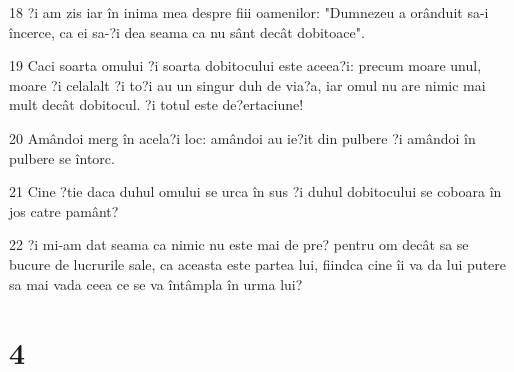 \par 18 ?i am zis iar în inima mea despre fiii oamenilor: "Dumnezeu a orânduit sa-i încerce, ca ei sa-?i dea seama ca nu sânt decât dobitoace".
\par 19 Caci soarta omului ?i soarta dobitocului este aceea?i: precum moare unul, moare ?i celalalt ?i to?i au un singur duh de via?a, iar omul nu are nimic mai mult decât dobitocul. ?i totul este de?ertaciune!
\par 20 Amândoi merg în acela?i loc: amândoi au ie?it din pulbere ?i amândoi în pulbere se întorc.
\par 21 Cine ?tie daca duhul omului se urca în sus ?i duhul dobitocului se coboara în jos catre pamânt?
\par 22 ?i mi-am dat seama ca nimic nu este mai de pre? pentru om decât sa se bucure de lucrurile sale, ca aceasta este partea lui, fiindca cine îi va da lui putere sa mai vada ceea ce se va întâmpla în urma lui?

\chapter{4}

